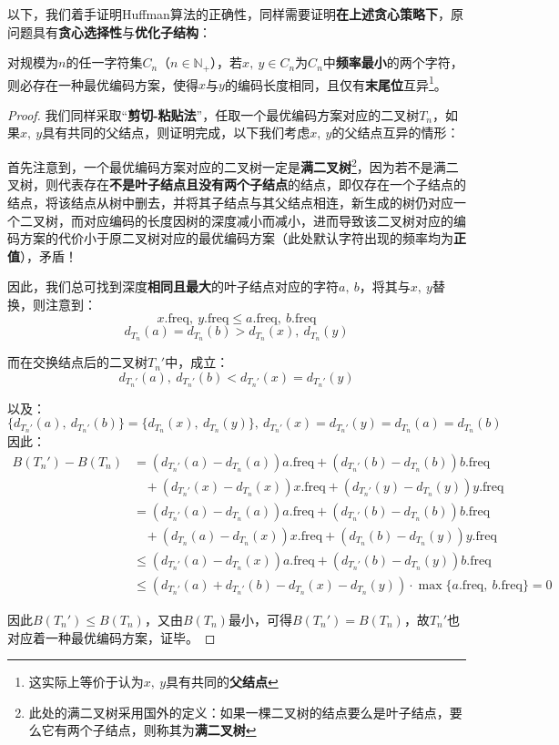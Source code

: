 \documentclass[12pt,a4paper,violet,oneside]{bbe}
\begin{document}
以下，我们着手证明Huffman算法的正确性，同样需要证明\textbf{在上述贪心策略下}，原问题具有\textbf{贪心选择性}与\textbf{优化子结构}：
\begin{lemma}
	对规模为$n$的任一字符集$C_n$（$n\in\mathbb{N}_+$），若$x,~y\in C_n$为$C_n$中\textbf{频率最小}的两个字符，则必存在一种最优编码方案，使得$x$与$y$的编码长度相同，且仅有\textbf{末尾位}互异\footnote{这实际上等价于认为$x,~y$具有共同的\textbf{父结点}}。
\end{lemma}
\begin{proof}
	我们同样采取“\textbf{剪切-粘贴法}”，任取一个最优编码方案对应的二叉树$T_n$，如果$x,~y$具有共同的父结点，则证明完成，以下我们考虑$x,~y$的父结点互异的情形：
	
	首先注意到，一个最优编码方案对应的二叉树一定是\textbf{满二叉树}\footnote{此处的满二叉树采用国外的定义：如果一棵二叉树的结点要么是叶子结点，要么它有两个子结点，则称其为\textbf{满二叉树}}，因为若不是满二叉树，则代表存在\textbf{不是叶子结点且没有两个子结点}的结点，即仅存在一个子结点的结点，将该结点从树中删去，并将其子结点与其父结点相连，新生成的树仍对应一个二叉树，而对应编码的长度因树的深度减小而减小，进而导致该二叉树对应的编码方案的代价小于原二叉树对应的最优编码方案（此处默认字符出现的频率均为\textbf{正值}），矛盾！
	
	因此，我们总可找到深度\textbf{相同且最大}的叶子结点对应的字符$a,~b$，将其与$x,~y$替换，则注意到：
	$$
	x.\text{freq},~y.\text{freq}\leqslant a.\text{freq},~b.\text{freq}
	$$
	$$
	d_{T_n}(a)=d_{T_n}(b)>d_{T_n}(x),~d_{T_n}(y)
	$$
	
	而在交换结点后的二叉树$T_n'$中，成立：
	$$
	d_{T_n'}(a),~d_{T_n'}(b)<d_{T_n'}(x)=d_{T_n'}(y)
	$$
	
	以及：
	$$
	\{d_{T_n'}(a),~d_{T_n'}(b)\}=\{d_{T_n}(x),~d_{T_n}(y)\},~d_{T_n'}(x)=d_{T_n'}(y)=d_{T_n}(a)=d_{T_n}(b)
	$$
	因此：
	$$
	\begin{array}{rl}
		B(T_n')-B(T_n)&=(d_{T_n'}(a)-d_{T_n}(a))a.\text{freq}+(d_{T_n'}(b)-d_{T_n}(b))b.\text{freq}\\
		&~~~~+(d_{T_n'}(x)-d_{T_n}(x))x.\text{freq}+(d_{T_n'}(y)-d_{T_n}(y))y.\text{freq}\\
		&=(d_{T_n'}(a)-d_{T_n}(a))a.\text{freq}+(d_{T_n'}(b)-d_{T_n}(b))b.\text{freq}\\
		&~~~~+(d_{T_n}(a)-d_{T_n}(x))x.\text{freq}+(d_{T_n}(b)-d_{T_n}(y))y.\text{freq}\\
		&\leqslant(d_{T_n'}(a)-d_{T_n}(x))a.\text{freq}+(d_{T_n'}(b)-d_{T_n}(y))b.\text{freq}\\
		&\leqslant(d_{T_n'}(a)+d_{T_n'}(b)-d_{T_n}(x)-d_{T_n}(y))\cdot\max\{a.\text{freq},~b.\text{freq}\}=0
	\end{array}
	$$
	
	因此$B(T_n')\leqslant B(T_n)$，又由$B(T_n)$最小，可得$B(T_n')=B(T_n)$，故$T_n'$也对应着一种最优编码方案，证毕。
\end{proof}
\end{document}
